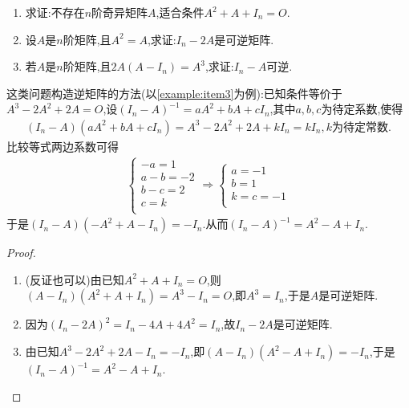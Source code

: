 \documentclass[../../main.tex]{subfiles}%
\begin{document}
\begin{example}
\begin{enumerate}
\item 求证:不存在\(n\)阶奇异矩阵\(A\),适合条件\(A^2 + A+I_n = O\).
\item 设\(A\)是\(n\)阶矩阵,且\(A^2 = A\),求证:\(I_n - 2A\)是可逆矩阵.
\item \label{example:item3}若\(A\)是\(n\)阶矩阵,且\(2A(A - I_n)=A^3\),求证:\(I_n - A\)可逆.
\end{enumerate}
\end{example}
\begin{note}
这类问题构造逆矩阵的方法(以\ref{example:item3}为例):已知条件等价于$A^3-2A^2+2A=O$,设$(I_n-A)^{-1}=aA^2+bA+cI_n$,其中$a,b,c$为待定系数,使得\begin{align*}
\left( I_n-A \right) \left( aA^2+bA+cI_n \right) =A^3-2A^2+2A+kI_n=kI_n,k\text{为待定常数}.
\end{align*}
比较等式两边系数可得
\begin{align*}
\begin{cases}
-a=1\\
a-b=-2\\
b-c=2\\
c=k\\
\end{cases}\Rightarrow \begin{cases}
a=-1\\
b=1\\
k=c=-1\\
\end{cases}
\end{align*}
于是$\left( I_n-A \right) \left( -A^2+A-I_n \right) =-I_n.$从而$\left( I_n-A \right) ^{-1}=A^2-A+I_n.$
\end{note}
\begin{proof}
\begin{enumerate}
\item (反证也可以)由已知\(A^2 + A+I_n = O\),则\((A - I_n)(A^2 + A+I_n)=A^3 - I_n = O\),即\(A^3 = I_n\),于是\(A\)是可逆矩阵.
\item 因为\((I_n - 2A)^2 = I_n - 4A + 4A^2 = I_n\),故\(I_n - 2A\)是可逆矩阵.
\item 由已知\(A^3 - 2A^2 + 2A - I_n=-I_n\),即\((A - I_n)(A^2 - A + I_n)=-I_n\),于是\((I_n - A)^{-1}=A^2 - A + I_n\).
\end{enumerate}

\end{proof}
\end{document}
